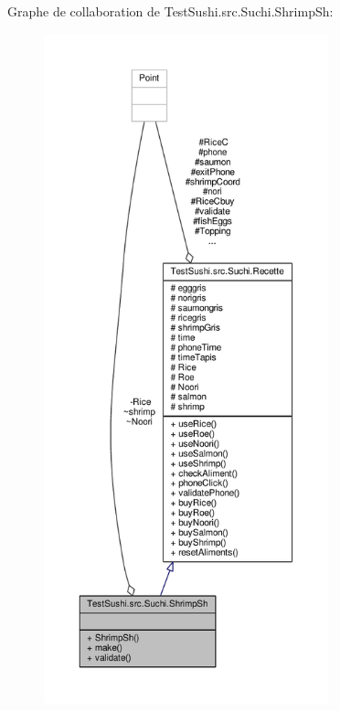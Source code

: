 Graphe de collaboration de Test\+Sushi.\+src.\+Suchi.\+Shrimp\+Sh\+:\nopagebreak
\begin{figure}[H]
\begin{center}
\leavevmode
\includegraphics[height=550pt]{classTestSushi_1_1src_1_1Suchi_1_1ShrimpSh__coll__graph}
\end{center}
\end{figure}
